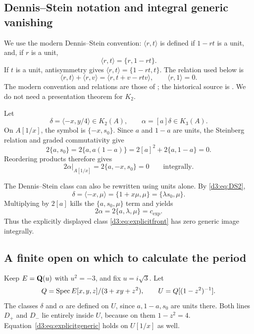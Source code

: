 \subsection{Dennis--Stein notation and integral generic vanishing}
We use the modern Dennis--Stein convention: $\langle r,t\rangle$ is defined if $1-rt$ is a unit, and, if $r$ is a unit,
\[
\langle r,t\rangle=\{r,1-rt\}.
\]
If $t$ is a unit, antisymmetry gives $\langle r,t\rangle=\{1-rt,t\}$. The relation used below is
\begin{equation}\label{d3:eq:DS2}
\langle r,t\rangle+\langle r,v\rangle
=\langle r,t+v-rtv\rangle,
\qquad \langle r,1\rangle=0.
\end{equation}
The modern convention and relations are those of \cite[III, Definition~5.11 and (D1)--(D3)]{Weibel}; the historical source is \cite{DennisStein}. We do not need a presentation theorem for $K_2$.

Let
\[
\delta=\langle -x,y/4\rangle\in K_2(A),\qquad
\alpha=[a]\delta\in K_3(A).
\]
On $A[1/x]$, the symbol is $\{-x,s_0\}$. Since $a$ and $1-a$ are units, the Steinberg relation and graded commutativity give
\[
2\{a,s_0\}=2\{a,a(1-a)\}
=2[a]^2+2\{a,1-a\}=0.
\]
Reordering products therefore gives
\begin{equation}\label{d3:eq:explicitgeneric}
2\alpha|_{A[1/x]}=2\{a,-x,s_0\}=0
\qquad\text{integrally}.
\end{equation}

The Dennis--Stein class can also be rewritten using units alone. By \eqref{d3:eq:DS2},
\[
\delta=\langle -x,\mu\rangle=\{1+x\mu,\mu\}
=\{\lambda s_0,\mu\}.
\]
Multiplying by $2[a]$ kills the $\{a,s_0,\mu\}$ term and yields
\begin{equation}\label{d3:eq:explicitDS}
2\alpha=2\{a,\lambda,\mu\}=c_{\mathrm{exp}}.
\end{equation}
Thus the explicitly displayed class \eqref{d3:eq:explicitfront} has zero generic image integrally.

\subsection{A finite open on which to calculate the period}
Keep $E=\mathbf Q(u)$ with $u^2=-3$, and fix $u=i\sqrt3$. Let
\[
Q=\operatorname{Spec} E[x,y,z]/(3+xy+z^2),\qquad
U=Q[(1-z^2)^{-1}].
\]
The classes $\delta$ and $\alpha$ are defined on $U$, since $a,1-a,s_0$ are units there. Both lines $D_+$ and $D_-$ lie entirely inside $U$, because on them $1-z^2=4$. Equation~\eqref{d3:eq:explicitgeneric} holds on $U[1/x]$ as well.

